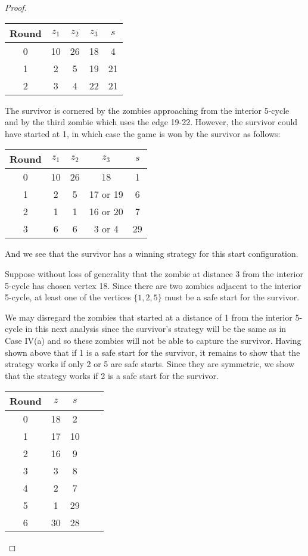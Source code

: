 \begin{proof}
\begin{description}
\begin{tabular}{c | c | c | c | c }
Round & $z_1$ & $z_2$ & $z_3$ & $s$ \\
\hline
0 & 10 & 26 & 18 & 4 \\
1 & 2 & 5 & 19 & 21 \\
2 & 3 & 4 & 22 & 21
\end{tabular}

The survivor is cornered by the zombies approaching from the interior 5-cycle and by the third zombie which uses the edge 19-22.
However, the survivor could have started at 1, in which case the game is won by the survivor as follows:

\begin{tabular}{c | c | c | c | c }
Round & $z_1$ & $z_2$ & $z_3$ & $s$ \\
\hline
0 & 10 & 26 & 18 & 1 \\
1 & 2 & 5 & 17 or 19 & 6 \\
2 & 1 & 1 & 16 or 20 & 7 \\
3 & 6 & 6 & 3 or 4 & 29
\end{tabular}

And we see that the survivor has a winning strategy for this start configuration.

Suppose without loss of generality that the zombie at distance 3 from the interior 5-cycle has chosen vertex 18.
Since there are two zombies adjacent to the interior 5-cycle, at least one of the vertices $\{1, 2, 5\}$ must be a safe start for the survivor.

We may disregard the zombies that started at a distance of 1 from the interior 5-cycle in this next analysis since the survivor's strategy will be the
same as in Case IV(a) and so these zombies will not be able to capture the survivor. Having shown above that if 1 is a safe start for the survivor, it
remains to show that the strategy works if only 2 or 5 are safe starts. Since they are symmetric, we show that the strategy works if 2 is a safe start for the
survivor.

\begin{tabular}{c | c | c | c | c }
Round & $z$ & $s$ \\
\hline
0 & 18 & 2 \\
1 & 17 & 10 \\
2 & 16 & 9 \\
3 & 3 & 8 \\
4 & 2 & 7 \\
5 & 1 & 29 \\
6 & 30 & 28
\end{tabular}


\end{description}
\end{proof}

